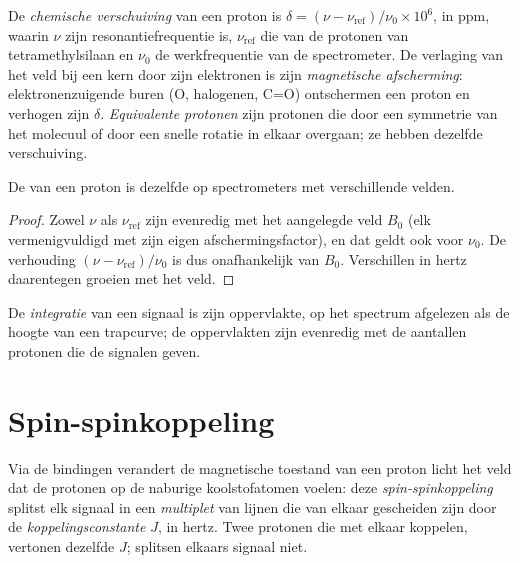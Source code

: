 \begin{definition}\label{def:b1:structure-spectroscopy:chemical-shift}
De \emph{chemische verschuiving} van een
proton is
$\delta = (\nu - \nu_{\text{ref}})/\nu_0 \times 10^6$, in \unit{ppm}, waarin
$\nu$ zijn resonantiefrequentie is, $\nu_{\text{ref}}$ die van de
protonen van tetramethylsilaan en $\nu_0$ de werkfrequentie van de
spectrometer. De verlaging van het veld bij een kern door zijn
elektronen is zijn \emph{magnetische
afscherming}: elektronenzuigende buren
(O, halogenen, C=O) ontschermen een proton en verhogen zijn $\delta$.
\emph{Equivalente protonen} zijn protonen die
door een symmetrie van het molecuul of door een snelle rotatie in elkaar
overgaan; ze hebben dezelfde verschuiving.
\end{definition}

\begin{proposition}\label{prop:b1:structure-spectroscopy:shift-field-independent}
De  van een proton is dezelfde op spectrometers met
verschillende velden.
\end{proposition}

\begin{proof}
Zowel $\nu$ als $\nu_{\text{ref}}$ zijn evenredig met het aangelegde veld
$B_0$ (elk vermenigvuldigd met zijn eigen afschermingsfactor), en dat
geldt ook voor $\nu_0$. De verhouding $(\nu - \nu_{\text{ref}})/\nu_0$ is
dus onafhankelijk van $B_0$. Verschillen in hertz daarentegen groeien met
het veld.
\end{proof}

\begin{definition}[Integratie]\label{def:b1:structure-spectroscopy:integration}
De \emph{integratie} van een signaal is zijn
oppervlakte, op het spectrum afgelezen als de hoogte van een trapcurve;
de oppervlakten zijn evenredig met de aantallen protonen die de signalen
geven.
\end{definition}

\section{Spin-spinkoppeling}

\begin{definition}\label{def:b1:structure-spectroscopy:coupling}
Via de bindingen verandert de magnetische toestand van een proton licht
het veld dat de protonen op de naburige koolstofatomen voelen: deze
\emph{spin-spinkoppeling} splitst elk signaal
in een \emph{multiplet} van lijnen die van elkaar
gescheiden zijn door de \emph{koppelingsconstante}
$J$, in hertz. Twee protonen die met elkaar koppelen, vertonen dezelfde
$J$;  splitsen elkaars signaal niet.
\end{definition}


